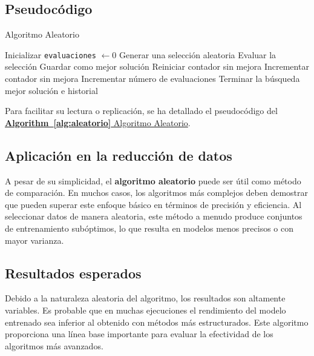 \subsection{Pseudocódigo}\label{subsec:Pseudocodigo-aleatorio}
\begin{algorithm}[htp]
      \caption{Algoritmo Aleatorio}
      \label{alg:aleatorio}
      \begin{algorithmic}[1]
            \State Inicializar \texttt{evaluaciones} $\gets 0$
            \State Generar una selección aleatoria
            \State Evaluar la selección
            \State Guardar como mejor solución
            \State Reiniciar contador sin mejora
            \Else
            \State Incrementar contador sin mejora
            \EndIf
            \State Incrementar número de evaluaciones
            \State Terminar la búsqueda
            \EndIf
            \EndWhile
            \State \Return mejor solución e historial
      \end{algorithmic}
\end{algorithm}

Para facilitar su lectura o replicación, se ha detallado el pseudocódigo del \hyperref[alg:aleatorio]{\textbf{Algorithm~\ref*{alg:aleatorio}} Algoritmo Aleatorio}.

\subsection{Aplicación en la reducción de datos}\label{subsec:aplicacion-en-la-reduccion-de-datos-aleatorio}
A pesar de su simplicidad, el \textbf{algoritmo aleatorio} puede ser útil como método de comparación.
En muchos casos, los algoritmos más complejos deben demostrar que pueden superar este enfoque básico en términos de
precisión y eficiencia.
Al seleccionar datos de manera aleatoria, este método a menudo produce conjuntos de entrenamiento subóptimos, lo que
resulta en modelos menos precisos o con mayor varianza.

\subsection{Resultados esperados}\label{subsec:resultados-esperados-aleatorio}
Debido a la naturaleza aleatoria del algoritmo, los resultados son altamente variables.
Es probable que en muchas ejecuciones el rendimiento del modelo entrenado sea inferior al obtenido con métodos más
estructurados.
Este algoritmo proporciona una línea base importante para evaluar la efectividad de los algoritmos más avanzados.


